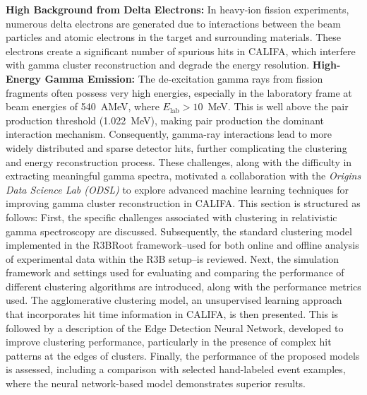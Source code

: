 \textbf{High Background from Delta Electrons:} In heavy-ion fission experiments, numerous delta electrons are generated due to interactions between the beam particles and atomic electrons in the target and surrounding materials. These electrons create a significant number of spurious hits in CALIFA, which interfere with gamma cluster reconstruction and degrade the energy resolution.\newline
\textbf{High-Energy Gamma Emission:} The de-excitation gamma rays from fission fragments often possess very high energies, especially in the laboratory frame at beam energies of 540~AMeV, where $E_{\text{lab}} > 10$~MeV. This is well above the pair production threshold (1.022~MeV), making pair production the dominant interaction mechanism. Consequently, gamma-ray interactions lead to more widely distributed and sparse detector hits, further complicating the clustering and energy reconstruction process.\newline
These challenges, along with the difficulty in extracting meaningful gamma spectra, motivated a collaboration with the \textit{Origins Data Science Lab (ODSL)} to explore advanced machine learning techniques for improving gamma cluster reconstruction in CALIFA.\newline
This section is structured as follows:\newline
First, the specific challenges associated with clustering in relativistic gamma spectroscopy are discussed. Subsequently, the standard clustering model implemented in the R3BRoot framework--used for both online and offline analysis of experimental data within the R3B setup--is reviewed.\newline
Next, the simulation framework and settings used for evaluating and comparing the performance of different clustering algorithms are introduced, along with the performance metrics used.\newline
The agglomerative clustering model, an unsupervised learning approach that incorporates hit time information in CALIFA, is then presented.\newline
This is followed by a description of the Edge Detection Neural Network, developed to improve clustering performance, particularly in the presence of complex hit patterns at the edges of clusters.\newline
Finally, the performance of the proposed models is assessed, including a comparison with selected hand-labeled event examples, where the neural network-based model demonstrates superior results.

